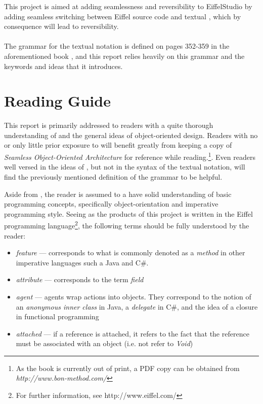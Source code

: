 This project is aimed at adding seamlessness and reversibility to EiffelStudio by adding seamless switching between Eiffel source code and textual \bon{}, which by consequence will lead to reversibility.

\paragraph{}
The grammar for the textual \bon{} notation is defined on pages 352-359 in the aforementioned book \cite{walden1995}, and this report relies heavily on this grammar and the keywords and ideas that it introduces.

\section{Reading Guide}
This report is primarily addressed to readers with a quite thorough understanding of \bon{} and the general ideas of object-oriented design. Readers with no or only little prior exposure to \bon{} will benefit greatly from keeping a copy of \textit{Seamless Object-Oriented Architecture} for reference while reading.\footnote{As the book is currently out of print, a PDF copy can be obtained from \textit{http://www.bon-method.com/}}. Even readers well versed in the ideas of \bon{}, but not in the syntax of the textual notation, will find the previously mentioned definition of the grammar to be helpful.

Aside from \bon{}, the reader is assumed to a have solid understanding of basic programming concepts, specifically object-orientation and imperative programming style. Seeing as the products of this project is written in the Eiffel programming language\footnote{For further information, see http://www.eiffel.com/}, the following terms should be fully understood by the reader:
\begin{itemize}
\item \textit{feature} --- corresponds to what is commonly denoted as a \textit{method} in other imperative languages such a Java and C\#.
\item \textit{attribute} --- corresponds to the term \textit{field}
\item \textit{agent} --- agents wrap actions into objects. They correspond to the notion of an \textit{anonymous inner class} in Java, a \textit{delegate} in C\#, and the idea of a closure in functional programming
\item \textit{attached} --- if a reference is attached, it refers to the fact that the reference must be associated with an object (i.e. not refer to \textit{Void})
\end{itemize} 

